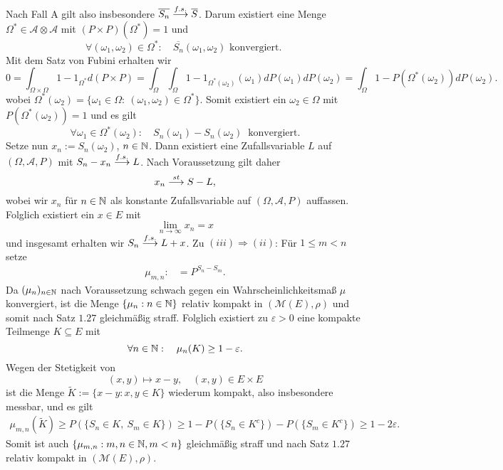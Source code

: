 \begin{proof*}
$$    $$
    Nach Fall A gilt also insbesondere $\overline{S_n} \overset{f.s.}{\longrightarrow}  \overline{S}$. Darum existiert eine Menge $\Omega^* \in \mathcal{A}\otimes\mathcal{A}$ mit \mbox{$(P\times P)(\Omega^*) = 1$} und
    $$  
        \forall (\omega_1, \omega_2) \in \Omega^*: \quad \overline{S_n}(\omega_1, \omega_2) \text{ konvergiert. }
    $$
    Mit dem Satz von Fubini erhalten wir
    $$
        0 = \int_{\Omega \times \Omega}1 - 1_{\Omega^*} d(P \times P) = \int_{\Omega}\int_{\Omega}1 - 1_{\Omega^*(\omega_2)}(\omega_1)dP(\omega_1)dP(\omega_2) = \int_{\Omega}1 - P(\Omega^*(\omega_2))dP(\omega_2). 
    $$
    wobei $\Omega^*(\omega_2) =\{\omega_1\in\Omega: \ (\omega_1, \omega_2) \in \Omega^* \}$. Somit existiert ein $\omega_2 \in \Omega$ mit $P(\Omega^*(\omega_2)) = 1$ und es gilt
    $$
        \forall \omega_1 \in \Omega^*(\omega_2): \quad S_n(\omega_1) - S_n(\omega_2) \ \text{ konvergiert.}
    $$
    Setze nun $x_n := S_n(\omega_2)$, $n \in \mathbb{N}$. Dann existiert eine Zufallsvariable $L$ auf $(\Omega, \mathcal{A}, P)$ mit \mbox{$S_n - x_n \overset{f.s.}{\longrightarrow} L$.} Nach Voraussetzung gilt daher 
    $$
        x_n \overset{st}{\longrightarrow} S - L,
    $$
    wobei wir $x_n$ für $n \in \mathbb{N}$ als konstante Zufallsvariable auf $(\Omega, \mathcal{A}, P)$ auffassen. Folglich existiert ein $x \in E$ mit 
    $$
        \lim_{n \to \infty}x_n = x
    $$
    und insgesamt erhalten wir $S_n \overset{f.s.}{\longrightarrow} L + x$. 
    \newline 
    Zu $(iii) \Rightarrow (ii)$: Für $1 \leq m < n$ setze
    \begin{align*}
        \mu_{m,n} :&= P^{S_n - S_m}. 
    \end{align*}
    Da $(\mu_n)_{n \in \mathbb{N}}$ nach Voraussetzung schwach gegen ein Wahrscheinlichkeitsmaß $\mu$ konvergiert,
    ist die Menge $\{\mu_n: n \in \mathbb{N} \}$ relativ kompakt in $(\mathcal{M}(E), \rho)$ und somit nach Satz $1.27$ gleichmäßig straff.
    Folglich existiert zu $\varepsilon > 0$ eine kompakte Teilmenge $K \subseteq E$ mit 
    $$
        \forall n \in \mathbb{N}: \quad \mu_n(K) \geq 1 - \varepsilon. 
    $$
    Wegen der Stetigkeit von 
    $$
        (x,y) \mapsto x - y, \quad (x,y) \in E \times E
    $$
    ist die Menge $\tilde{K} := \{x - y : x,y \in K \}$ wiederum kompakt, also insbesondere messbar, und es gilt
    \begin{align*}
        \mu_{m,n}(\tilde{K}) \geq P(\{S_n \in K, \ S_m \in K\}) \geq 1 - P(\{S_n \in K^c\}) - P(\{S_m \in K^c\}) \geq 1 - 2\varepsilon.
    \end{align*}
    Somit ist auch $\{\mu_{m,n}: m,n \in \mathbb{N}, m < n \}$ gleichmäßig straff und nach Satz $1.27$ relativ kompakt in $(\mathcal{M}(E), \rho)$. 

\end{proof*}
